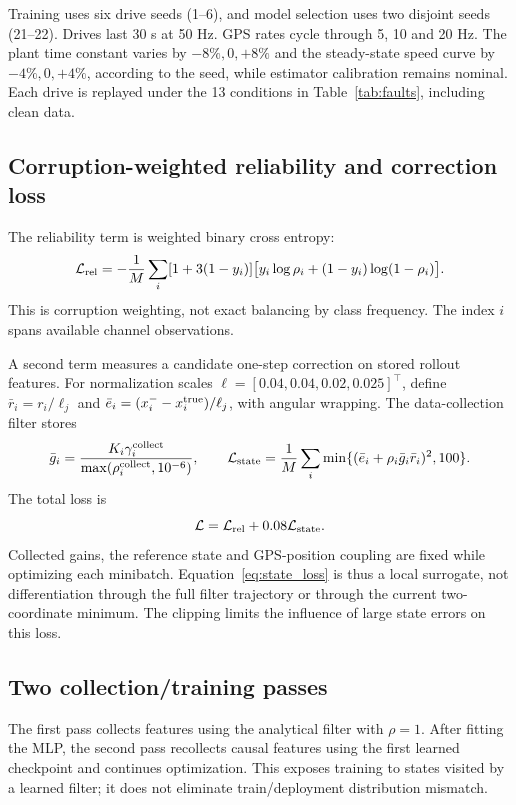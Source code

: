 ﻿\documentclass[10pt,a4paper]{article}
\begin{document}
Training uses six drive seeds (1--6), and model selection uses two disjoint seeds (21--22).
Drives last 30 s at 50 Hz. GPS rates cycle through 5, 10 and 20 Hz.
The plant time constant varies by $-8\%,0,+8\%$ and the steady-state speed curve by
$-4\%,0,+4\%$, according to the seed, while estimator calibration remains nominal.
Each drive is replayed under the 13 conditions in Table~\ref{tab:faults}, including clean data.

\subsection{Corruption-weighted reliability and correction loss}
The reliability term is weighted binary cross entropy:
\begin{equation}
 \mathcal L_{\rm rel}
 =-\frac{1}{M}\sum_i [1+3(1-y_i)]
       \big[y_i\log\rho_i+(1-y_i)\log(1-\rho_i)\big].
 \label{eq:bce}
\end{equation}
This is corruption weighting, not exact balancing by class frequency.
The index $i$ spans available channel observations.

A second term measures a candidate one-step correction on stored rollout features.
For normalization scales $\bm\ell=[0.04,0.04,0.02,0.025]^\top$, define
$\bar r_i=r_i/\ell_j$ and
$\bar e_i=(x_i^- -x_i^{\rm true})/\ell_j$, with angular wrapping.
The data-collection filter stores
\begin{equation}
 \bar g_i=\frac{K_i\gamma_i^{\rm collect}}
                  {\max(\rho_i^{\rm collect},10^{-6})},
 \qquad
 \mathcal L_{\rm state}=\frac{1}{M}\sum_i
          \min\{(\bar e_i+\rho_i\bar g_i\bar r_i)^2,100\}.
 \label{eq:state_loss}
\end{equation}
The total loss is
\begin{equation}
 \mathcal L=\mathcal L_{\rm rel}+0.08\mathcal L_{\rm state}.
 \label{eq:loss}
\end{equation}
Collected gains, the reference state and GPS-position coupling are fixed while optimizing
each minibatch. Equation~\eqref{eq:state_loss} is thus a local surrogate, not differentiation
through the full filter trajectory or through the current two-coordinate minimum.
The clipping limits the influence of large state errors on this loss.

\subsection{Two collection/training passes}
The first pass collects features using the analytical filter with $\rho=1$.
After fitting the MLP, the second pass recollects causal features using the first learned
checkpoint and continues optimization. This exposes training to states visited by a
learned filter; it does not eliminate train/deployment distribution mismatch.
\end{document}
